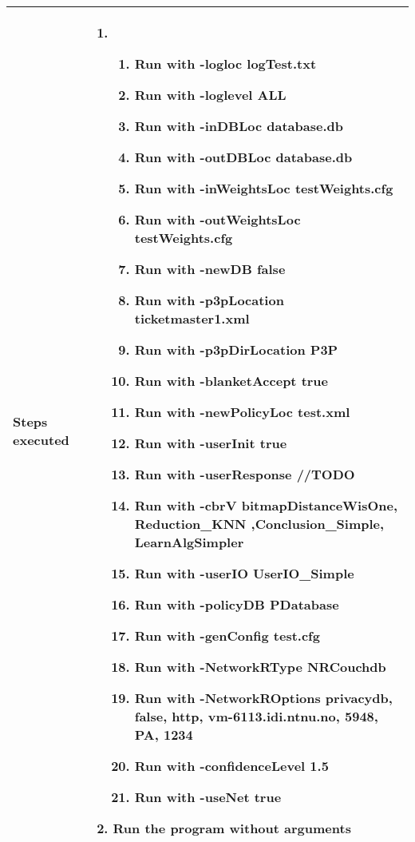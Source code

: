 \begin{center}
\begin{longtable}{ | p{4cm} | p{10cm} | }
			Steps executed & 	\begin{enumerate}
							\item
							\begin{enumerate}
								\item Run with -logloc logTest.txt
								\item Run with -loglevel ALL
								\item Run with -inDBLoc database.db
								\item Run with -outDBLoc database.db
								\item Run with -inWeightsLoc testWeights.cfg
								\item Run with -outWeightsLoc testWeights.cfg
								\item Run with -newDB false
								\item Run with -p3pLocation ticketmaster1.xml
								\item Run with -p3pDirLocation P3P
								\item Run with -blanketAccept true
								\item Run with -newPolicyLoc test.xml
								\item Run with -userInit true
								\item Run with -userResponse //TODO
								\item Run with -cbrV bitmapDistanceWisOne, Reduction\_KNN ,Conclusion\_Simple, LearnAlgSimpler
								\item Run with -userIO UserIO\_Simple
								\item Run with -policyDB PDatabase
								\item Run with -genConfig test.cfg
								\item Run with -NetworkRType NRCouchdb
								\item Run with -NetworkROptions privacydb, false, http, vm-6113.idi.ntnu.no, 5948, PA, 1234
								\item Run with -confidenceLevel 1.5
								\item Run with -useNet true
							\end{enumerate}
							\item Run the program without arguments
						\end{enumerate} \\ [3pt] \hline
			

\end{longtable}
\end{center}
